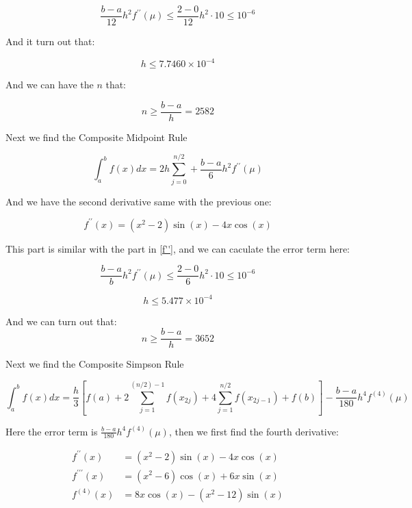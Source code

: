 \begin{solution}
\begin{equation*}
\frac{b-a}{12} h^{2} f^{\prime \prime}(\mu) \leq \frac{2-0}{12} h^{2} \cdot 10 \leq 10^{-6}
\end{equation*}


And it turn out that:


$$
h \leq 7.7460 \times 10^{-4}
$$


And we can have the $n$ that:


$$
n \geq \frac{b-a}{h}=2582
$$







\dotfill


Next we find the Composite Midpoint Rule


\begin{equation}
\int_{a}^{b} f(x) d x=2 h \sum_{j=0}^{n / 2}+\frac{b-a}{6} h^{2} f^{\prime \prime}(\mu)
\end{equation}


And we have the second derivative same with the previous one:


\begin{equation}
f^{\prime \prime}(x)=\left(x^{2}-2\right) \sin (x)-4 x \cos (x)
\end{equation}

This part is similar with the part in \ref{f''}, and we can caculate the error term here:


$$
\frac{b-a}{b} h^{2} f^{\prime \prime}(\mu)\leq \frac{2-0}{6} h^{2} \cdot 10 \leq 10^{-6}
$$


$$
h \leq 5.477 \times 10^{-4}
$$


And we can turn out that:
$$
n \geq \frac{b-a}{h}=3652
$$





\dotfill




Next we find the Composite Simpson Rule

\begin{equation*}
	\int_{a}^{b} f(x) d x=\frac{h}{3}\left[f(a)+2 \sum_{j=1}^{(n / 2)-1} f\left(x_{2 j}\right)+4 \sum_{j=1}^{n / 2} f\left(x_{2 j-1}\right)+f(b)\right]-\frac{b-a}{180} h^{4} f^{(4)}(\mu)
\end{equation*}


Here the error term is $\frac{b-a}{180} h^{4} f^{(4)}(\mu)$, then we first find the fourth derivative:


\begin{equation*}
\begin{aligned}
f^{\prime \prime}(x)&=\left(x^{2}-2\right) \sin (x)-4 x \cos (x) \\
f^{\prime \prime \prime}(x)&=\left(x^{2}-6\right) \cos (x)+6 x \sin (x) \\
f^{(4)}(x)&=8 x \cos (x)-\left(x^{2}-12\right) \sin (x)
\end{aligned}
\end{equation*}



\end{solution}

